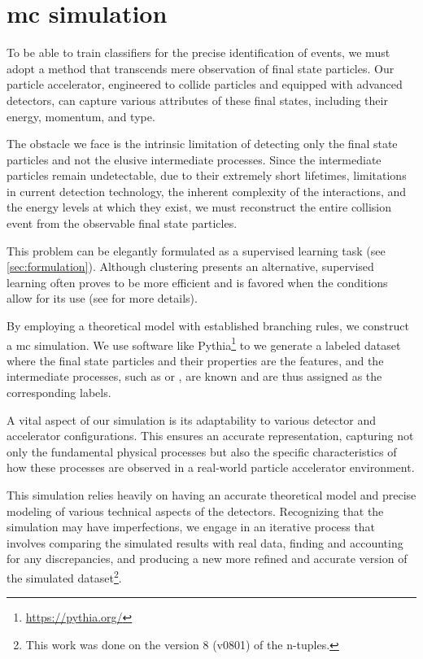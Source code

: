 
\section[Monte Carlo simulation]{\gls{mc} simulation}
\label{sec:mc}

To be able to train classifiers for the precise identification of \tth events, we must adopt a method that transcends
mere observation of final state particles. Our particle accelerator, engineered to collide particles and equipped with
advanced detectors, can capture various attributes of these final states, including their energy, momentum, and type.

The obstacle we face is the intrinsic limitation of detecting only the final state particles and not the elusive
intermediate processes. Since the intermediate particles remain undetectable, due to their extremely short lifetimes,
limitations in current detection technology, the inherent complexity of the interactions, and the energy levels at which
they exist, we must reconstruct the entire collision event from the observable final state particles.

This problem can be elegantly formulated as a supervised learning task (see \autoref{sec:formulation}). Although
clustering presents an alternative, supervised learning often proves to be more efficient and is favored when the
conditions allow for its use (see  for more details).

By employing a theoretical model with established branching rules, we construct a \gls{mc} simulation.  We use software
like Pythia\footnote{\url{https://pythia.org/}} to we generate a labeled dataset where the
final state particles and their properties are the features, and the intermediate processes, such as \tth or \ttw, are
known and are thus assigned as the corresponding labels.

A vital aspect of our simulation is its adaptability to various detector and accelerator configurations. This ensures an
accurate representation, capturing not only the fundamental physical processes but also the specific characteristics of
how these processes are observed in a real-world particle accelerator environment.

This simulation relies heavily on having an accurate theoretical model and precise modeling of various technical aspects
of the detectors. Recognizing that the simulation may have imperfections, we engage in an iterative process that
involves comparing the simulated results with real data, finding and accounting for any discrepancies, and producing a
new more refined and accurate version of the simulated dataset\footnote{This work was done on the version 8 (v0801) of
    the n-tuples.}.



